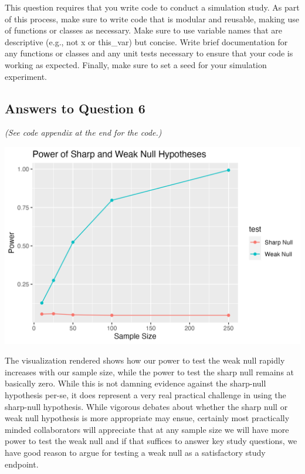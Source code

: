 \documentclass[
  letterpaper,
  DIV=11,
  numbers=noendperiod]{scrartcl}
\begin{document}
\begin{tcolorbox}[enhanced jigsaw, colframe=quarto-callout-warning-color-frame, breakable, opacitybacktitle=0.6, title=\textcolor{quarto-callout-warning-color}{\faExclamationTriangle}\hspace{0.5em}{Warning}, colback=white, leftrule=.75mm, colbacktitle=quarto-callout-warning-color!10!white, toprule=.15mm, coltitle=black, opacityback=0, bottomtitle=1mm, toptitle=1mm, titlerule=0mm, rightrule=.15mm, arc=.35mm, left=2mm, bottomrule=.15mm]

This question requires that you write code to conduct a simulation
study. As part of this process, make sure to write code that is modular
and reusable, making use of functions or classes as necessary. Make sure
to use variable names that are descriptive (e.g., not x or this\_var)
but concise. Write brief documentation for any functions or classes and
any unit tests necessary to ensure that your code is working as
expected. Finally, make sure to set a seed for your simulation
experiment.

\end{tcolorbox}

\hypertarget{answers-to-question-6}{%
\subsection{Answers to Question 6}\label{answers-to-question-6}}

\emph{(See code appendix at the end for the code.)}

\includegraphics[width=6in,height=\textheight]{power_curve.png}

The visualization rendered shows how our power to test the weak null
rapidly increases with our sample size, while the power to test the
sharp null remains at basically zero. While this is not damning evidence
against the sharp-null hypothesis per-se, it does represent a very real
practical challenge in using the sharp-null hypothesis. While vigorous
debates about whether the sharp null or weak null hypothesis is more
appropriate may ensue, certainly most practically minded collaborators
will appreciate that at any sample size we will have more power to test
the weak null and if that suffices to answer key study questions, we
have good reason to argue for testing a weak null as a satisfactory
study endpoint.
\end{document}
